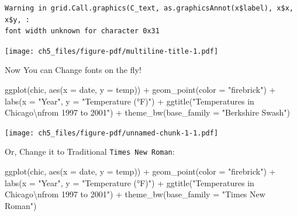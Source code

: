 \documentclass[
  letterpaper,
]{scrbook}
\newenvironment{Shaded}{\begin{snugshade}}{\end{snugshade}}
\newcommand{\AttributeTok}[1]{\textcolor[rgb]{0.40,0.45,0.13}{#1}}
\newcommand{\FunctionTok}[1]{\textcolor[rgb]{0.28,0.35,0.67}{#1}}
\newcommand{\NormalTok}[1]{\textcolor[rgb]{0.00,0.23,0.31}{#1}}
\newcommand{\SpecialCharTok}[1]{\textcolor[rgb]{0.37,0.37,0.37}{#1}}
\newcommand{\StringTok}[1]{\textcolor[rgb]{0.13,0.47,0.30}{#1}}
\begin{document}
\begin{verbatim}
Warning in grid.Call.graphics(C_text, as.graphicsAnnot(x$label), x$x, x$y, :
font width unknown for character 0x31
\end{verbatim}

\texttt{[image: ch5\_files/figure-pdf/multiline-title-1.pdf]}

Now You can Change fonts on the fly!

\begin{Shaded}
\begin{Highlighting}[]
\FunctionTok{ggplot}\NormalTok{(chic, }\FunctionTok{aes}\NormalTok{(}\AttributeTok{x =}\NormalTok{ date, }\AttributeTok{y =}\NormalTok{ temp)) }\SpecialCharTok{+}
    \FunctionTok{geom\_point}\NormalTok{(}\AttributeTok{color =} \StringTok{"firebrick"}\NormalTok{) }\SpecialCharTok{+}
    \FunctionTok{labs}\NormalTok{(}\AttributeTok{x =} \StringTok{"Year"}\NormalTok{, }\AttributeTok{y =} \StringTok{"Temperature (°F)"}\NormalTok{) }\SpecialCharTok{+}
    \FunctionTok{ggtitle}\NormalTok{(}\StringTok{"Temperatures in Chicago}\SpecialCharTok{\textbackslash{}n}\StringTok{from 1997 to 2001"}\NormalTok{) }\SpecialCharTok{+}
    \FunctionTok{theme\_bw}\NormalTok{(}\AttributeTok{base\_family =} \StringTok{"Berkshire Swash"}\NormalTok{)}
\end{Highlighting}
\end{Shaded}

\texttt{[image: ch5\_files/figure-pdf/unnamed-chunk-1-1.pdf]}

Or, Change it to Traditional \texttt{Times\ New\ Roman}:

\begin{Shaded}
\begin{Highlighting}[]
\FunctionTok{ggplot}\NormalTok{(chic, }\FunctionTok{aes}\NormalTok{(}\AttributeTok{x =}\NormalTok{ date, }\AttributeTok{y =}\NormalTok{ temp)) }\SpecialCharTok{+}
    \FunctionTok{geom\_point}\NormalTok{(}\AttributeTok{color =} \StringTok{"firebrick"}\NormalTok{) }\SpecialCharTok{+}
    \FunctionTok{labs}\NormalTok{(}\AttributeTok{x =} \StringTok{"Year"}\NormalTok{, }\AttributeTok{y =} \StringTok{"Temperature (°F)"}\NormalTok{) }\SpecialCharTok{+}
    \FunctionTok{ggtitle}\NormalTok{(}\StringTok{"Temperatures in Chicago}\SpecialCharTok{\textbackslash{}n}\StringTok{from 1997 to 2001"}\NormalTok{) }\SpecialCharTok{+}
    \FunctionTok{theme\_bw}\NormalTok{(}\AttributeTok{base\_family =} \StringTok{"Times New Roman"}\NormalTok{)}
\end{Highlighting}
\end{Shaded}
\end{document}

